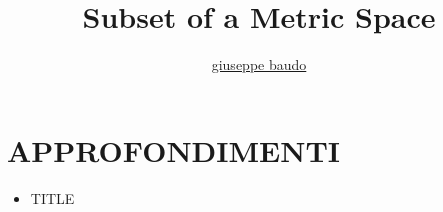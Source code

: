 \documentclass[a4paper,10pt]{article}
\title{Subset of a Metric Space}
\author{\href{http://www.baudo.hol.es}{giuseppe baudo}}
\begin{document}
\maketitle

\section{APPROFONDIMENTI}
\begin{itemize}
 \item TITLE
\end{itemize}
\end{document}
